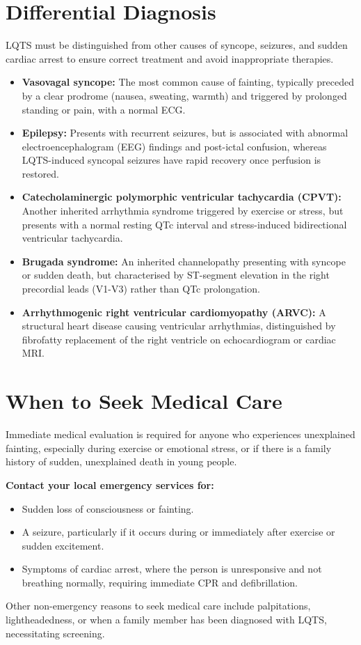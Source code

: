 \section*{Differential Diagnosis}
LQTS must be distinguished from other causes of syncope, seizures, and sudden cardiac arrest to ensure correct treatment and avoid inappropriate therapies.
\begin{itemize}
    \item \textbf{Vasovagal syncope:} The most common cause of fainting, typically preceded by a clear prodrome (nausea, sweating, warmth) and triggered by prolonged standing or pain, with a normal ECG.
    \item \textbf{Epilepsy:} Presents with recurrent seizures, but is associated with abnormal electroencephalogram (EEG) findings and post-ictal confusion, whereas LQTS-induced syncopal seizures have rapid recovery once perfusion is restored.
    \item \textbf{Catecholaminergic polymorphic ventricular tachycardia (CPVT):} Another inherited arrhythmia syndrome triggered by exercise or stress, but presents with a normal resting QTc interval and stress-induced bidirectional ventricular tachycardia.
    \item \textbf{Brugada syndrome:} An inherited channelopathy presenting with syncope or sudden death, but characterised by ST-segment elevation in the right precordial leads (V1-V3) rather than QTc prolongation.
    \item \textbf{Arrhythmogenic right ventricular cardiomyopathy (ARVC):} A structural heart disease causing ventricular arrhythmias, distinguished by fibrofatty replacement of the right ventricle on echocardiogram or cardiac MRI.
\end{itemize}

\section*{When to Seek Medical Care}
Immediate medical evaluation is required for anyone who experiences unexplained fainting, especially during exercise or emotional stress, or if there is a family history of sudden, unexplained death in young people.

\textbf{Contact your local emergency services for:}
\begin{itemize}
    \item Sudden loss of consciousness or fainting.
    \item A seizure, particularly if it occurs during or immediately after exercise or sudden excitement.
    \item Symptoms of cardiac arrest, where the person is unresponsive and not breathing normally, requiring immediate CPR and defibrillation.
\end{itemize}
Other non-emergency reasons to seek medical care include palpitations, lightheadedness, or when a family member has been diagnosed with LQTS, necessitating screening.

